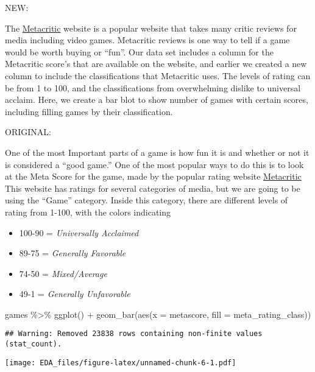 \documentclass[
]{article}
\newenvironment{Shaded}{\begin{snugshade}}{\end{snugshade}}
\newcommand{\AttributeTok}[1]{\textcolor[rgb]{0.77,0.63,0.00}{#1}}
\newcommand{\FunctionTok}[1]{\textcolor[rgb]{0.00,0.00,0.00}{#1}}
\newcommand{\NormalTok}[1]{#1}
\newcommand{\SpecialCharTok}[1]{\textcolor[rgb]{0.00,0.00,0.00}{#1}}
\providecommand{\tightlist}{%
  \setlength{\itemsep}{0pt}\setlength{\parskip}{0pt}}
\begin{document}
NEW:

The \href{https://www.metacritic.com/}{Metacritic} website is a popular
website that takes many critic reviews for media including video games.
Metacritic reviews is one way to tell if a game would be worth buying or
``fun''. Our data set includes a column for the Metacritic score's that
are available on the website, and earlier we created a new column to
include the classifications that Metacritic uses. The levels of rating
can be from 1 to 100, and the classifications from overwhelming dislike
to universal acclaim. Here, we create a bar blot to show number of games
with certain scores, including filling games by their classification.

ORIGINAL:

One of the most Important parts of a game is how fun it is and whether
or not it is considered a ``good game.'' One of the most popular ways to
do this is to look at the Meta Score for the game, made by the popular
rating website \href{https://www.metacritic.com/}{Metacritic} This
website has ratings for several categories of media, but we are going to
be using the ``Game'' category. Inside this category, there are
different levels of rating from 1-100, with the colors indicating

\begin{itemize}
\tightlist
\item
  100-90 = \emph{Universally Acclaimed}
\item
  89-75 = \emph{Generally Favorable}
\item
  74-50 = \emph{Mixed/Average}
\item
  49-1 = \emph{Generally Unfavorable}
\end{itemize}

\begin{Shaded}
\begin{Highlighting}[]
\NormalTok{games }\SpecialCharTok{\%\textgreater{}\%}
  \FunctionTok{ggplot}\NormalTok{() }\SpecialCharTok{+}
  \FunctionTok{geom\_bar}\NormalTok{(}\FunctionTok{aes}\NormalTok{(}\AttributeTok{x =}\NormalTok{ metascore,}
               \AttributeTok{fill =}\NormalTok{ meta\_rating\_class))}
\end{Highlighting}
\end{Shaded}

\begin{verbatim}
## Warning: Removed 23838 rows containing non-finite values (stat_count).
\end{verbatim}

\texttt{[image: EDA\_files/figure-latex/unnamed-chunk-6-1.pdf]}
\end{document}
